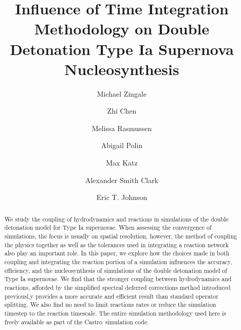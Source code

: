 \documentclass[modern]{aastex631}
\newcommand{\castro}{{\sf Castro}}
\begin{document}
\title{Influence of Time Integration Methodology on Double Detonation Type
Ia Supernova Nucleosynthesis}


\author[0000-0001-8401-030X]{Michael Zingale}

\author[0000-0002-2839-107X]{Zhi Chen}


\author{Melissa Rasmussen}

\author{Abigail Polin}

\author[0000-0003-0439-4556]{Max Katz}


\author[0000-0001-5961-1680]{Alexander Smith Clark}

\author[0000-0003-3603-6868]{Eric T. Johnson}



\begin{abstract}
We study the coupling of hydrodynamics and reactions in simulations of
the double detonation model for Type Ia supernovae.  When assessing the
convergence of simulations, the focus is usually on spatial resolution, 
however, the method of coupling the physics together as well as the
tolerances used in integrating a reaction network also play an important role.
In this paper, we explore how the choices made in both coupling and integrating the reaction
portion of a simulation influences the accuracy, efficiency, and the nucleosynthesis
of simulations of the double detonation model of Type Ia supernovae.
We find that the stronger coupling between hydrodynamics and reactions,
afforded by the simplified spectral deferred corrections method introduced
previousl,y provides a more accurate and efficient result than standard
operator splitting.  We also find no need to limit reactions rates or reduce the
simulation timestep to the reaction timescale.  The entire simulation
methodology used here is freely available as part of the \castro\ simulation
code.
\end{abstract}
\end{document}
